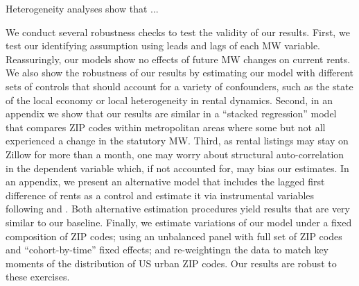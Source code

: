Heterogeneity analyses show that ...


We conduct several robustness checks to test the validity of our results.
First, we test our identifying assumption using leads and lags of each MW 
variable.
Reassuringly, our models show no effects of future MW changes on current rents.
We also show the robustness of our results by estimating our model with different 
sets of controls that should account for a variety of confounders, such as the 
state of the local economy or local heterogeneity in rental dynamics.
Second, in an appendix we show that our results are similar in a ``stacked 
regression'' model that compares ZIP codes within metropolitan areas where some 
but not all experienced a change in the statutory MW.
Third, as rental listings may stay on Zillow for more than a month, one may worry 
about structural auto-correlation in the dependent variable which, if not 
accounted for, may bias our estimates.
In an appendix, we present an alternative model that includes the lagged first 
difference of rents as a control and estimate it via instrumental variables
following \textcite{ArellanoBond1991} and \textcite{MeerWest2016}.
Both alternative estimation procedures yield results that are very similar to our 
baseline.
Finally, we estimate variations of our model under a fixed composition of ZIP 
codes;
using an unbalanced panel with full set of ZIP codes and ``cohort-by-time'' fixed 
effects; and re-weightingn the data to match key moments of the distribution of 
US urban ZIP codes.
Our results are robust to these exercises.


